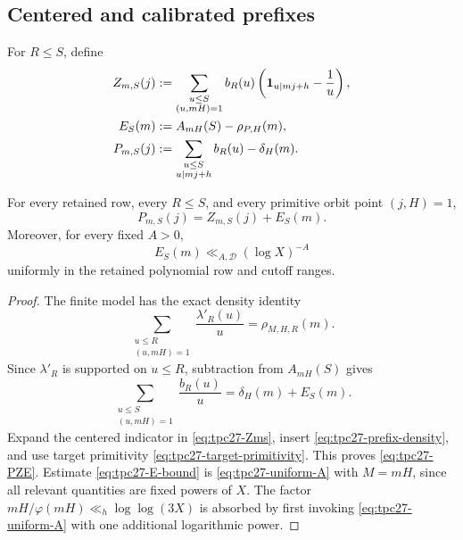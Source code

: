 \subsection{Centered and calibrated prefixes}

For \(R\le S\), define
\begin{align}
 Z_{m,S}(j)
 &:=\sum_{\substack{u\le S\\(u,mH)=1}}
 b_R(u)\left(\mathbf 1_{u\mid mj+h}-\frac1u\right),
 \label{eq:tpc27-Zms}\\
 E_S(m)&:=A_{mH}(S)-\rho_{P,H}(m),
 \label{eq:tpc27-ES}\\
 P_{m,S}(j)&:=
 \sum_{\substack{u\le S\\u\mid mj+h}}b_R(u)-\delta_H(m).
 \label{eq:tpc27-Pms}
\end{align}

\begin{proposition}
\label{prop:tpc27-PZE}
For every retained row, every \(R\le S\), and every primitive orbit
point \((j,H)=1\),
\begin{equation}
 \boxed{P_{m,S}(j)=Z_{m,S}(j)+E_S(m).}
 \label{eq:tpc27-PZE}
\end{equation}
Moreover, for every fixed \(A>0\),
\begin{equation}
 \boxed{E_S(m)\ll_{A,\mathscr D}(\log X)^{-A}}
 \label{eq:tpc27-E-bound}
\end{equation}
uniformly in the retained polynomial row and cutoff ranges.
\end{proposition}

\begin{proof}
The finite model has the exact density identity
\begin{equation}
 \sum_{\substack{u\le R\\(u,mH)=1}}
 \frac{\lambda'_R(u)}u=\rho_{M,H,R}(m).
 \label{eq:tpc27-model-density-identity}
\end{equation}
Since \(\lambda'_R\) is supported on \(u\le R\), subtraction from
\(A_{mH}(S)\) gives
\begin{equation}
 \sum_{\substack{u\le S\\(u,mH)=1}}
 \frac{b_R(u)}u
 =\delta_H(m)+E_S(m).
 \label{eq:tpc27-prefix-density}
\end{equation}
Expand the centered indicator in \eqref{eq:tpc27-Zms}, insert
\eqref{eq:tpc27-prefix-density}, and use target primitivity
\eqref{eq:tpc27-target-primitivity}.  This proves
\eqref{eq:tpc27-PZE}.  Estimate \eqref{eq:tpc27-E-bound} is
\eqref{eq:tpc27-uniform-A} with \(M=mH\), since all relevant quantities
are fixed powers of \(X\).  The factor
\(mH/\varphi(mH)\ll_h\log\log(3X)\) is absorbed by first invoking
\eqref{eq:tpc27-uniform-A} with one additional logarithmic power.
\end{proof}

